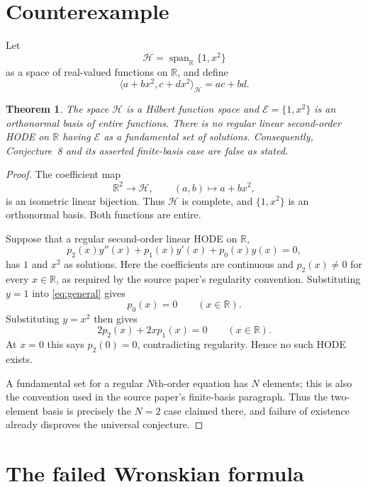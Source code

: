 \documentclass[11pt]{article}
\newtheorem{theorem}{Theorem}
\newcommand{\R}{\mathbb R}
\newcommand{\cH}{\mathcal H}
\begin{document}
\section{Counterexample}

Let
\[
  \cH=\operatorname{span}_{\R}\{1,x^2\}
\]
as a space of real-valued functions on $\R$, and define
\[
 \big\langle a+bx^2,c+dx^2\big\rangle_{\cH}=ac+bd.
\]

\begin{theorem}\label{thm:counterexample}
The space $\cH$ is a Hilbert function space and
$\mathcal E=\{1,x^2\}$ is an orthonormal basis of entire functions.  There
is no regular linear second-order HODE on $\R$ having $\mathcal E$ as a
fundamental set of solutions.  Consequently, Conjecture~8 and its asserted
finite-basis case are false as stated.
\end{theorem}

\begin{proof}
The coefficient map
\[
  \R^2\longrightarrow\cH,\qquad (a,b)\longmapsto a+bx^2,
\]
is an isometric linear bijection.  Thus $\cH$ is complete, and
$\{1,x^2\}$ is an orthonormal basis.  Both functions are entire.

Suppose that a regular second-order linear HODE on $\R$,
\begin{equation}\label{eq:general}
 p_2(x)y''(x)+p_1(x)y'(x)+p_0(x)y(x)=0,
\end{equation}
has $1$ and $x^2$ as solutions.  Here the coefficients are continuous and
$p_2(x)\ne0$ for every $x\in\R$, as required by the source paper's regularity
convention.  Substituting $y=1$ into \eqref{eq:general} gives
\[
  p_0(x)=0\qquad(x\in\R).
\]
Substituting $y=x^2$ then gives
\[
  2p_2(x)+2x p_1(x)=0\qquad(x\in\R).
\]
At $x=0$ this says $p_2(0)=0$, contradicting regularity.  Hence no such HODE
exists.

A fundamental set for a regular $N$th-order equation has $N$ elements; this
is also the convention used in the source paper's finite-basis paragraph.
Thus the two-element basis is precisely the $N=2$ case claimed there, and
failure of existence already disproves the universal conjecture.
\end{proof}

\section{The failed Wronskian formula}
\end{document}
